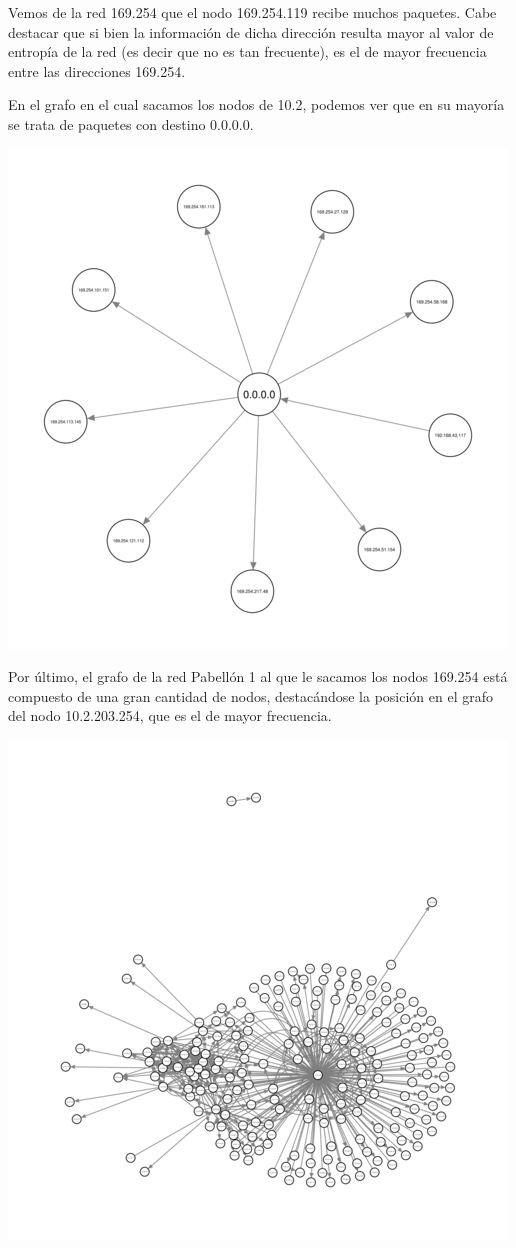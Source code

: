 Vemos de la red 169.254 que el nodo 169.254.119 recibe muchos
paquetes. Cabe destacar que si bien la información de dicha dirección
resulta mayor al valor de entropía de la red (es decir que no es tan
frecuente), es el de mayor frecuencia entre las direcciones 169.254.

En el grafo en el cual sacamos los nodos de 10.2, podemos ver que
en su mayoría se trata de paquetes con destino 0.0.0.0.

\begin{center}
\includegraphics[scale=0.5]{../img/exactas-sin10-2.png}
\end{center}

Por último, el grafo de la red Pabellón 1 al que le sacamos los nodos
169.254 está compuesto de una gran cantidad de nodos, destacándose
la posición en el grafo del nodo 10.2.203.254, que es el de mayor
frecuencia.

\begin{center}
\includegraphics{../img/exactas-sin169.png}
\end{center}
